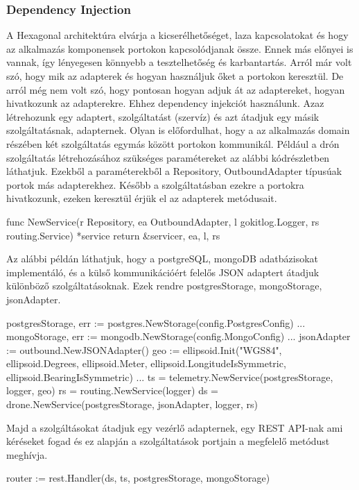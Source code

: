 \subsubsection{Dependency Injection}
A Hexagonal architektúra elvárja a kicserélhetőséget, laza kapcsolatokat és hogy az alkalmazás komponensek portokon kapcsolódjanak össze.
Ennek más előnyei is vannak, így lényegesen könnyebb a tesztelhetőség és karbantartás.
Arról már volt szó, hogy mik az adapterek és hogyan használjuk őket a portokon keresztül.
De arról még nem volt szó, hogy pontosan hogyan adjuk át az adaptereket, hogyan hivatkozunk az adapterekre.
Ehhez dependency injekciót használunk.
Azaz létrehozunk egy adaptert, szolgáltatást (szervíz) és azt átadjuk egy másik szolgáltatásnak, adapternek.
Olyan is előfordulhat, hogy a az alkalmazás domain részében két szolgáltatás egymás között portokon kommunikál.
Például a drón szolgáltatás létrehozásához szükséges paramétereket az alábbi kódrészletben láthatjuk.
Ezekből a paraméterekből a Repository, OutboundAdapter típusúak portok más adapterekhez.
Később a szolgáltatásban ezekre a portokra hivatkozunk, ezeken keresztül érjük el az adapterek metódusait.

\begin{python}
    func NewService(r Repository, ea OutboundAdapter, l gokitlog.Logger, rs routing.Service) *service {
        return &service{r, ea, l, rs}
    }
\end{python}

Az alábbi példán láthatjuk, hogy a postgreSQL, mongoDB adatbázisokat implementáló, és a külső kommunikációért felelős JSON adaptert átadjuk különböző szolgáltatásoknak.
Ezek rendre postgresStorage, mongoStorage, jsonAdapter.
\begin{python}
    postgresStorage, err := postgres.NewStorage(config.PostgresConfig)
    ...
    mongoStorage, err := mongodb.NewStorage(config.MongoConfig)
    ...
    jsonAdapter := outbound.NewJSONAdapter()
    geo := ellipsoid.Init("WGS84", ellipsoid.Degrees, ellipsoid.Meter, ellipsoid.LongitudeIsSymmetric, ellipsoid.BearingIsSymmetric)
    ...
    ts = telemetry.NewService(postgresStorage, logger, geo)
    rs = routing.NewService(logger)
    ds = drone.NewService(postgresStorage, jsonAdapter, logger, rs)
\end{python}

Majd a szolgáltásokat átadjuk egy vezérlő adapternek, egy REST API-nak ami kéréseket fogad és ez alapján a szolgáltatások portjain a megfelelő metódust meghívja.
\begin{python}
    router := rest.Handler(ds, ts, postgresStorage, mongoStorage)
\end{python}

